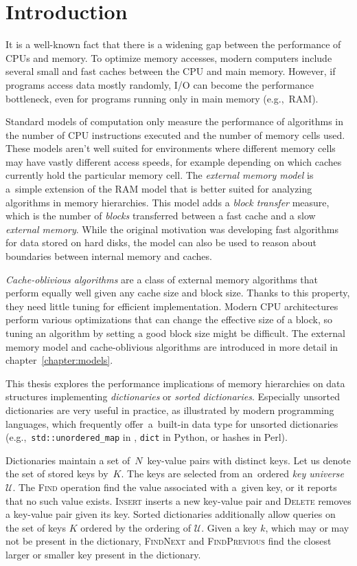 \chapter*{Introduction}

It is a well-known fact that there is a widening gap between
the performance of CPUs and memory. To optimize memory accesses,
modern computers include several small and fast caches between the CPU and
main memory. However, if programs access data mostly randomly, I/O can become
the performance bottleneck, even for programs running only in main memory
(e.g.,\ RAM).

Standard models of computation only measure the performance of algorithms
in the number of CPU instructions executed and the number of memory cells used.
These models aren't well suited for environments where different memory cells
may have vastly different access speeds, for example depending on which caches
currently hold the particular memory cell. The \emph{external memory model}
is a~simple extension of the RAM model that is better suited for analyzing
algorithms in memory hierarchies. This model adds a \emph{block transfer}
measure, which is the number of \emph{blocks} transferred between a fast cache
and a slow \emph{external memory}.
While the original motivation was developing fast algorithms for data stored on
hard disks, the model can also be used to reason about boundaries between
internal memory and caches.

\emph{Cache-oblivious algorithms} are a class of external memory algorithms
that perform equally well given any cache size and block size. Thanks to this
property, they need little tuning for efficient implementation.
Modern CPU architectures perform various optimizations that can change
the effective size of a block, so tuning an algorithm by setting a good block
size might be difficult.
The external memory model and cache-oblivious algorithms are introduced in more
detail in chapter~\ref{chapter:models}.

This thesis explores the performance implications of memory hierarchies
on data structures implementing \emph{dictionaries} or \emph{sorted
dictionaries}.
Especially unsorted dictionaries are very useful in practice, as illustrated
by modern programming languages, which frequently offer~a~built-in
data type for unsorted dictionaries (e.g.,\ \texttt{std::unordered\_map} in
\Cpp{}, \texttt{dict} in Python, or hashes in Perl).

Dictionaries maintain a set of~$N$~key-value pairs with distinct keys.
Let us denote the set of stored keys by~$K$.
The keys are selected from an~ordered \emph{key universe}~$\mathcal{U}$.
The \textsc{Find} operation find the value associated with a~given key, or
it reports that no such value exists. \textsc{Insert} inserts a new
key-value pair and \textsc{Delete} removes a key-value pair given its key.
Sorted dictionaries additionally allow queries on the set of keys $K$ ordered
by the ordering of $\mathcal{U}$.
Given a key $k$, which may or may not be present in the dictionary,
\textsc{FindNext} and \textsc{FindPrevious} find the closest larger or smaller
key present in the dictionary.

